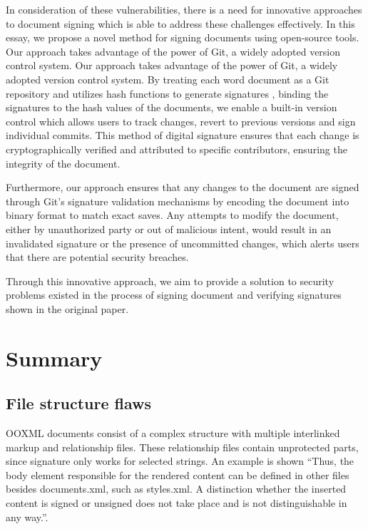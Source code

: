 \documentclass[conference]{IEEEtran}
\begin{document}
        In consideration of these vulnerabilities, there is a need for innovative approaches to document signing which is able to address these challenges effectively. In this essay, we propose a novel method for signing documents using open-source tools. Our approach takes advantage of the power of Git, a widely adopted version control system. Our approach takes advantage of the power of Git, a widely adopted version control system. By treating each word document as a Git repository and utilizes hash functions to generate signatures \cite{b3}, binding the signatures to the hash values of the documents, we enable a built-in version control which allows users to track changes, revert to previous versions and sign individual commits. This method of digital signature ensures that each change is cryptographically verified and attributed to specific contributors, ensuring the integrity of the document\cite{b4}.
        
        Furthermore, our approach ensures that any changes to the document are signed through Git’s signature validation mechanisms by encoding the document into binary format to match exact saves. Any attempts to modify the document, either by unauthorized party or out of malicious intent, would result in an invalidated signature or the presence of uncommitted changes, which alerts users that there are potential security breaches.
        
        Through this innovative approach, we aim to provide a solution to security problems existed in the process of signing document and verifying signatures shown in the original paper.
    
    \section{Summary}
    
    
    
    \subsection{File structure flaws}
        OOXML documents consist of a complex structure with multiple interlinked markup and relationship files. These relationship files contain unprotected parts, since signature only works for selected strings. An example is shown \enquote{Thus,
        the body element responsible for the rendered content can
        be defined in other files besides documents.xml, such as
        styles.xml. A distinction whether the inserted content is
        signed or unsigned does not take place and is not distinguishable
        in any way.}.
        
\end{document}
